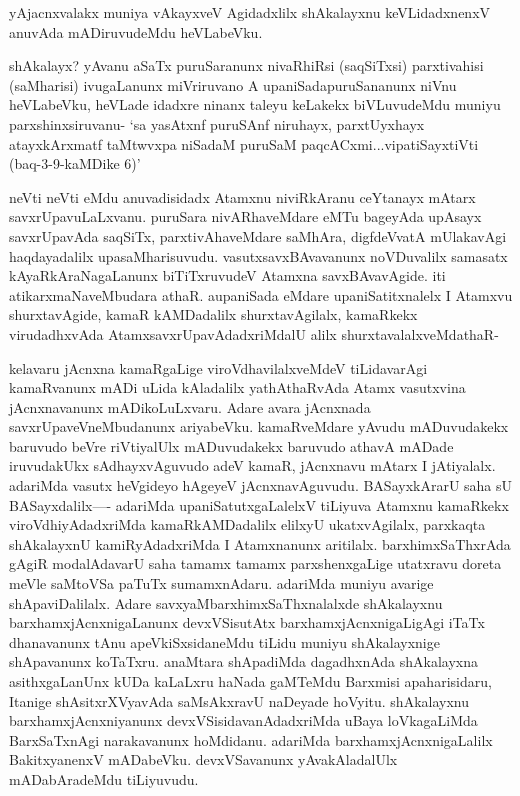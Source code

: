 \begin{artha}
yAjacnxvalakx muniya vAkayxveV Agidadxlilx shAkalayxnu keVLidadxnenxV anuvAda mADiruvudeMdu heVLabeVku. 
\end{artha}


\begin{artha}
shAkalayx? yAvanu aSaTx puruSaranunx nivaRhiRsi (saqSiTxsi) parxtivahisi (saMharisi) ivugaLanunx miVriruvano A upaniSadapuruSananunx niVnu heVLabeVku, heVLade idadxre ninanx taleyu keLakekx biVLuvudeMdu muniyu parxshinxsiruvanu- `sa yasAtxnf puruSAnf niruhayx, parxtUyxhayx atayxkArxmatf taMtwvxpa niSadaM puruSaM paqcACxmi...vipatiSayxtiVti (baq-3-9-kaMDike 6)'
\end{artha}

\begin{artha}
neVti neVti eMdu anuvadisidadx Atamxnu niviRkAranu ceYtanayx mAtarx savxrUpavuLaLxvanu. puruSara nivARhaveMdare eMTu bageyAda upAsayx savxrUpavAda saqSiTx, parxtivAhaveMdare saMhAra, digfdeVvatA mUlakavAgi haqdayadalilx upasaMharisuvudu. vasutxsavxBAvavanunx noVDuvalilx samasatx kAyaRkAraNagaLanunx biTiTxruvudeV Atamxna savxBAvavAgide. iti atikarxmaNaveMbudara athaR. aupaniSada eMdare upaniSatitxnalelx I Atamxvu shurxtavAgide, kamaR kAMDadalilx shurxtavAgilalx, kamaRkekx virudadhxvAda AtamxsavxrUpavAdadxriMdalU alilx shurxtavalalxveMdathaR-
\end{artha}


\begin{artha}
kelavaru jAcnxna kamaRgaLige viroVdhavilalxveMdeV tiLidavarAgi kamaRvanunx mADi uLida kAladalilx yathAthaRvAda Atamx vasutxvina jAcnxnavanunx mADikoLuLxvaru. Adare avara jAcnxnada savxrUpaveVneMbudanunx ariyabeVku. kamaRveMdare yAvudu mADuvudakekx baruvudo beVre riVtiyalUlx mADuvudakekx baruvudo athavA mADade iruvudakUkx sAdhayxvAguvudo adeV kamaR, jAcnxnavu mAtarx I jAtiyalalx. adariMda vasutx heVgideyo hAgeyeV jAcnxnavAguvudu. BASayxkArarU saha sU BASayxdalilx---- adariMda upaniSatutxgaLalelxV tiLiyuva Atamxnu kamaRkekx viroVdhiyAdadxriMda kamaRkAMDadalilx elilxyU ukatxvAgilalx, parxkaqta  shAkalayxnU kamiRyAdadxriMda I Atamxnanunx aritilalx. barxhimxSaThxrAda gAgiR modalAdavarU saha tamamx tamamx parxshenxgaLige utatxravu doreta meVle saMtoVSa paTuTx sumamxnAdaru. adariMda muniyu avarige shApaviDalilalx. Adare savxyaMbarxhimxSaThxnalalxde shAkalayxnu barxhamxjAcnxnigaLanunx devxVSisutAtx barxhamxjAcnxnigaLigAgi iTaTx dhanavanunx tAnu apeVkiSxsidaneMdu tiLidu muniyu shAkalayxnige shApavanunx koTaTxru. anaMtara shApadiMda dagadhxnAda shAkalayxna asithxgaLanUnx kUDa kaLaLxru haNada gaMTeMdu Barxmisi apaharisidaru, Itanige shAsitxrXVyavAda saMsAkxravU naDeyade hoVyitu. shAkalayxnu barxhamxjAcnxniyanunx devxVSisidavanAdadxriMda uBaya loVkagaLiMda BarxSaTxnAgi narakavanunx hoMdidanu. adariMda barxhamxjAcnxnigaLalilx BakitxyanenxV mADabeVku. devxVSavanunx yAvakAladalUlx mADabAradeMdu tiLiyuvudu. 
\end{artha}%

